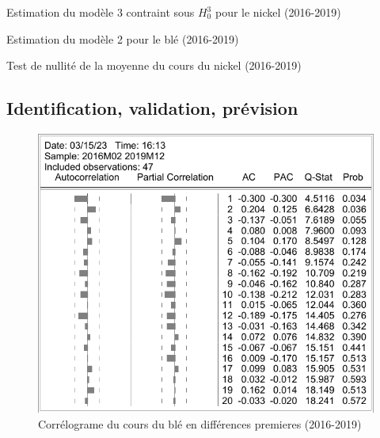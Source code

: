 \documentclass[12pt,a4paper]{article}
\begin{document}
\begin{table}[H]
    \centering
    \caption{Estimation du modèle 3 contraint sous $H_{0}^{3}$ pour le nickel (2016-2019)}
    \sffamily
    
    \label{tab:mod3cont_nickel19}
\end{table}

\begin{table}[H]
    \centering
    \caption{Estimation du modèle 2 pour le blé (2016-2019)}
    \sffamily
    
    \label{tab:mod2_nickel19}
\end{table}

\begin{table}[H]
    \centering
    \caption{Test de nullité de la moyenne du cours du nickel (2016-2019)}
    \sffamily
    
    \label{tab:testmoy_nickel19}
\end{table}

\subsection{Identification, validation, prévision}

\begin{figure}[H]
    \centering
    \label{fig:cor_dble19}
    \includegraphics[]{annexe/4_3_1_cor_dble19.pdf}
    \caption{Corrélograme du cours du blé en différences premieres (2016-2019)}
\end{figure}

\printbibliography
\end{document}
